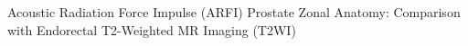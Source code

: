 Acoustic Radiation Force Impulse (ARFI) Prostate Zonal Anatomy: Comparison with Endorectal T2-Weighted MR Imaging (T2WI)
